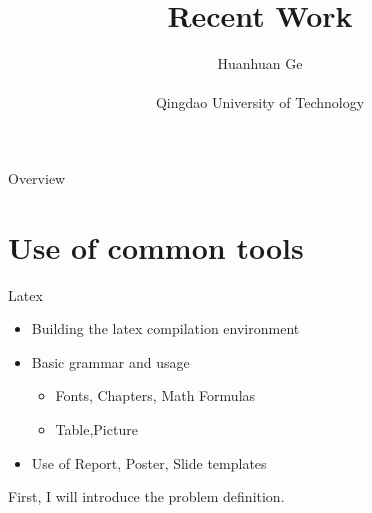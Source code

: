 \documentclass[
 size=12pt,
 paper=smartboard,  %
 mode=present, 		%
 display=slides, 	%
 style=tuliplab,  	%
 pauseslide,
 fleqn,leqno]{powerdot}
\title{Recent Work}
\author{
Huanhuan Ge
\\
\\Qingdao University of Technology
}
\date{\gitCommitterDate}
\begin{document}
\maketitle


\begin{slide}[toc=,bm=]{Overview}
\begin{spacing}{1.00}
\tableofcontents[content=currentsection,type=1]
\end{spacing}
\end{slide}


\section{Use of common tools}


\begin{slide}{Latex}
\begin{center}
\begin{itemize}
  \item
  Building the latex compilation environment
  \item
  Basic grammar and usage
  \begin{itemize}
    \item
    Fonts, Chapters, Math Formulas
    \item
    Table,Picture
  \end{itemize}
  \item
  Use of Report, Poster, Slide templates  
\end{itemize}
\end{center}
\begin{note}
First, I will introduce the problem definition.
\end{note}

\end{slide}


\end{document}
